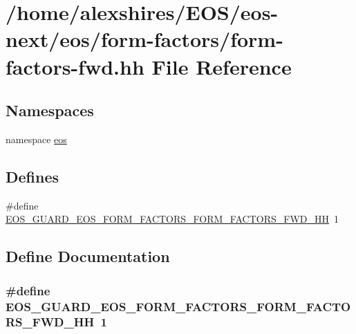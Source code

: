 \hypertarget{form-factors-fwd_8hh}{
\section{/home/alexshires/EOS/eos-\/next/eos/form-\/factors/form-\/factors-\/fwd.hh File Reference}
\label{form-factors-fwd_8hh}
}
\subsection*{Namespaces}
\begin{DoxyCompactItemize}
\item 
namespace \hyperlink{namespaceeos}{eos}
\end{DoxyCompactItemize}
\subsection*{Defines}
\begin{DoxyCompactItemize}
\item 
\#define \hyperlink{form-factors-fwd_8hh_a9a94f9ca1be35f29c38f445c4c72ddaa}{EOS\_\-GUARD\_\-EOS\_\-FORM\_\-FACTORS\_\-FORM\_\-FACTORS\_\-FWD\_\-HH}~1
\end{DoxyCompactItemize}


\subsection{Define Documentation}
\hypertarget{form-factors-fwd_8hh_a9a94f9ca1be35f29c38f445c4c72ddaa}{
\subsubsection[{EOS\_\-GUARD\_\-EOS\_\-FORM\_\-FACTORS\_\-FORM\_\-FACTORS\_\-FWD\_\-HH}]{\setlength{\rightskip}{0pt plus 5cm}\#define EOS\_\-GUARD\_\-EOS\_\-FORM\_\-FACTORS\_\-FORM\_\-FACTORS\_\-FWD\_\-HH~1}}
\label{form-factors-fwd_8hh_a9a94f9ca1be35f29c38f445c4c72ddaa}
